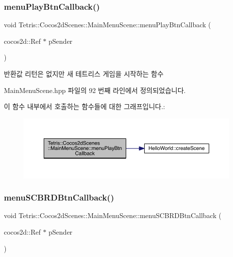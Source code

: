 \subsubsection{\texorpdfstring{menu\+Play\+Btn\+Callback()}{menuPlayBtnCallback()}}
{\footnotesize\ttfamily void Tetris\+::\+Cocos2d\+Scenes\+::\+Main\+Menu\+Scene\+::menu\+Play\+Btn\+Callback (\begin{DoxyParamCaption}\item[{cocos2d\+::\+Ref $\ast$}]{p\+Sender }\end{DoxyParamCaption})\hspace{0.3cm}{\ttfamily [inline]}}

\begin{DoxyReturn}{반환값}
리턴은 없지만 새 테트리스 게임을 시작하는 함수 
\end{DoxyReturn}


Main\+Menu\+Scene.\+hpp 파일의 92 번째 라인에서 정의되었습니다.

이 함수 내부에서 호출하는 함수들에 대한 그래프입니다.\+:
\nopagebreak
\begin{figure}[H]
\begin{center}
\leavevmode
\includegraphics[width=350pt]{class_tetris_1_1_cocos2d_scenes_1_1_main_menu_scene_a19f4cf80f17731583bec6a25d8de5acd_cgraph}
\end{center}
\end{figure}
\mbox{\label{class_tetris_1_1_cocos2d_scenes_1_1_main_menu_scene_a2fdee3d586584f0186569ccd13d2d7fc}} 
\subsubsection{\texorpdfstring{menu\+S\+C\+B\+R\+D\+Btn\+Callback()}{menuSCBRDBtnCallback()}}
{\footnotesize\ttfamily void Tetris\+::\+Cocos2d\+Scenes\+::\+Main\+Menu\+Scene\+::menu\+S\+C\+B\+R\+D\+Btn\+Callback (\begin{DoxyParamCaption}\item[{cocos2d\+::\+Ref $\ast$}]{p\+Sender }\end{DoxyParamCaption})\hspace{0.3cm}{\ttfamily [inline]}}

